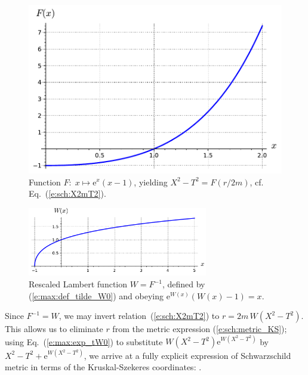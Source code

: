 \begin{figure}
\centerline{\includegraphics[height=0.25\textheight]{max_X2mT2.pdf}}
\caption[]{\label{f:max:X2mT2} \footnotesize
Function $F:\; x\mapsto \mathrm{e}^{x}(x-1)$, yielding
$X^2-T^2 = F(r/2m)$, cf. Eq.~(\ref{e:sch:X2mT2}).}
\end{figure}

\begin{figure}
\centerline{\includegraphics[width=0.7\textwidth]{max_lambert_rescaled.pdf}}
\caption[]{\label{f:max:lambert_rescaled} \footnotesize
Rescaled Lambert function $W = F^{-1}$, defined by (\ref{e:max:def_tilde_W0})
and obeying
$\mathrm{e}^{W(x)}(W(x)-1) = x$.}
\end{figure}

Since $F^{-1} = W$, we may invert relation~(\ref{e:sch:X2mT2})
to $r = 2m \, W(X^2-T^2)$.
This allows us to eliminate $r$ from the metric expression
(\ref{e:sch:metric_KS});
using Eq.~(\ref{e:max:exp_tW0}) to substitute $W(X^2 - T^2) \mathrm{e}^{W(X^2 - T^2)}$
by $X^2 - T^2 + \mathrm{e}^{W(X^2 - T^2)}$,
we arrive at a fully explicit expression of Schwarzschild metric in terms
of the Kruskal-Szekeres coordinates:
\be \label{e:sch:metric_KS_TX_partial}
    .
\ee

